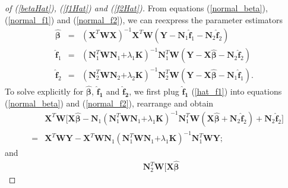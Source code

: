 \documentclass[article,lineno]{biometrika}
\begin{document}
%
%
\begin{proof} [of (\ref{betaHat}),  (\ref{f1Hat}) and  (\ref{f2Hat})]
From equations (\ref{normal_beta}), (\ref{normal_f1}) and (\ref{normal_f2}), we can reexpress the parameter estimators
\begin{eqnarray} 
\boldsymbol {\hat \beta}
&=&
(\boldsymbol X^T  \boldsymbol W\boldsymbol X)^{-1}  
\boldsymbol X^T  \boldsymbol W (\boldsymbol Y
- \boldsymbol N_1 \boldsymbol {\hat f}_1
- \boldsymbol N_2 \boldsymbol {\hat f}_2)
\nonumber
\\
\boldsymbol {\hat f}_1 
&=&
(\boldsymbol N_1^T  \boldsymbol W \boldsymbol N_1 \boldsymbol 
+ \lambda_1 \boldsymbol K)^{-1}
\boldsymbol N_1^T  \boldsymbol W
( \boldsymbol Y 
- \boldsymbol X \boldsymbol {\hat \beta}
-   \boldsymbol N_2 \boldsymbol {\hat f}_2) 
\label{hat_f1}\\ 
\boldsymbol {\hat f}_2 
&=& (\boldsymbol N_2^T  \boldsymbol W \boldsymbol N_2 \boldsymbol 
+ \lambda_2 \boldsymbol K)^{-1}
\boldsymbol N_2^T  \boldsymbol W (\boldsymbol Y -\boldsymbol X \boldsymbol {\hat \beta}
-  \boldsymbol N_1 \boldsymbol {\hat f}_1).  \label{hat_f2}
\end{eqnarray}
To solve explicitly for $\boldsymbol {\hat \beta}$, $\boldsymbol {\hat f_1}$ and $\boldsymbol {\hat f_2}$, we first plug $ \boldsymbol {\hat f_1}$ (\ref{hat_f1}) into equations (\ref{normal_beta}) and  (\ref{normal_f2}), rearrange and obtain 
\begin{eqnarray*} 
&&
\boldsymbol X^T  \boldsymbol W
\big[
\boldsymbol X \boldsymbol {\hat \beta} 
- 
\boldsymbol N_1 
 (\boldsymbol N_1^T  \boldsymbol W \boldsymbol N_1 \boldsymbol 
 + \lambda_1 \boldsymbol K)^{-1}
 \boldsymbol N_1^T  \boldsymbol W
  (\boldsymbol X \boldsymbol {\hat \beta} + \boldsymbol N_2 \boldsymbol {\hat f}_2)
+  \boldsymbol N_2 \boldsymbol {\hat f}_2
\big] \\
&=&
  \boldsymbol X^T  \boldsymbol W \boldsymbol Y
  - \boldsymbol X^T  \boldsymbol W
  \boldsymbol N_1 
 (\boldsymbol N_1^T  \boldsymbol W \boldsymbol N_1 \boldsymbol 
 + \lambda_1 \boldsymbol K)^{-1}
 \boldsymbol N_1^T  \boldsymbol W \boldsymbol Y;
\end{eqnarray*}
and
\begin{eqnarray*} 
&&
\boldsymbol N_2^T  \boldsymbol W
\big[
\boldsymbol X \boldsymbol {\hat \beta} 

\end{eqnarray*}
\end{proof}
\end{document}

